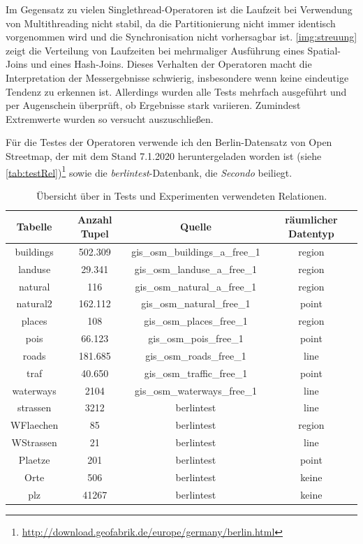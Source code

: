 \documentclass[a4paper,12pt,twoside]{article}
\newcommand{\Fb}[1]{\textit{#1}} %
\begin{document}
Im Gegensatz zu vielen Singlethread-Operatoren ist die Laufzeit bei Verwendung von Multithreading nicht stabil, da die Partitionierung nicht immer identisch vorgenommen wird und die Synchronisation nicht vorhersagbar ist. \autoref{img:streuung} zeigt die Verteilung von Laufzeiten bei mehrmaliger Ausführung eines Spatial-Joins und eines Hash-Joins. Dieses Verhalten der Operatoren macht die Interpretation der Messergebnisse schwierig, insbesondere wenn keine eindeutige Tendenz zu erkennen ist. Allerdings wurden alle Tests mehrfach ausgeführt und per Augenschein überprüft, ob Ergebnisse stark variieren. Zumindest Extremwerte wurden so versucht auszuschließen.  

Für die Testes der Operatoren verwende ich den Berlin-Datensatz von Open Streetmap, der mit dem Stand 7.1.2020 heruntergeladen worden ist (siehe \autoref{tab:testRel})\footnote{\url{http://download.geofabrik.de/europe/germany/berlin.html}} sowie die \Fb{berlintest}-Datenbank, die \Fb{Secondo} beiliegt.

\begin{table}
	\centering
\begin{tabular}{|c|c|c|c|}
	\hline
	\rowcolor{gray!30}
	Tabelle & Anzahl Tupel & Quelle & räumlicher Datentyp  \\ 
	\hline 
	buildings & 502.309 & gis\_osm\_buildings\_a\_free\_1 & region \\ 
	\hline 
	landuse & 29.341 & gis\_osm\_landuse\_a\_free\_1 & region \\ 
	\hline 
	natural & 116 & gis\_osm\_natural\_a\_free\_1 & region \\ 
	\hline 
	natural2 & 162.112 & gis\_osm\_natural\_free\_1 & point \\ 
	\hline
	places & 108 & gis\_osm\_places\_free\_1 & region \\ 
	\hline 
	pois & 66.123 & gis\_osm\_pois\_free\_1  & point \\ 
	\hline 
	roads & 181.685 & gis\_osm\_roads\_free\_1 & line \\ 
	\hline
	traf & 40.650 & gis\_osm\_traffic\_free\_1  & point \\ 
	\hline 
	waterways & 2104 & gis\_osm\_waterways\_free\_1 & line \\ 
	\hline
	strassen & 3212 &  berlintest & line \\ 
	\hline
	WFlaechen & 85 &  berlintest & region \\ 
	\hline 
	WStrassen & 21 &  berlintest & line \\ 
	\hline 
	Plaetze & 201 &  berlintest & point \\ 
	\hline 
	Orte & 506 & berlintest & keine \\ 
	\hline
	plz & 41267 & berlintest & keine \\ 
	\hline 
\end{tabular}
\caption{\label{tab:testRel} Übersicht über in Tests und Experimenten verwendeten Relationen.}
\end{table}
\end{document}
